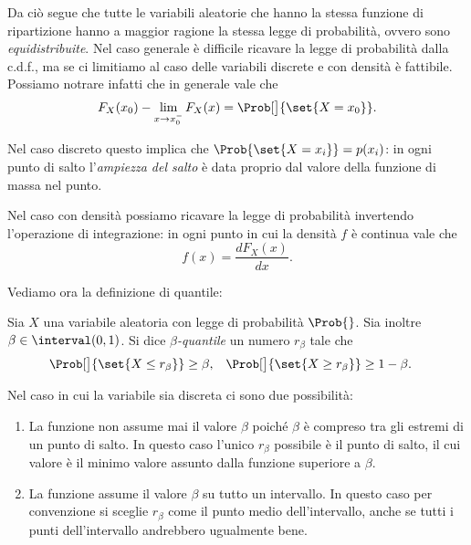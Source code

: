 Da ciò segue che tutte le variabili aleatorie che hanno la stessa funzione di ripartizione hanno a maggior ragione la stessa legge di probabilità, ovvero sono \emph{equidistribuite}. Nel caso generale è difficile ricavare la legge di probabilità dalla c.d.f., ma se ci limitiamo al caso delle variabili discrete e con densità è fattibile. Possiamo notrare infatti che in generale vale che \[
    F_X(x_0) - \lim_{x \to x_0^-} F_X(x) = \Prob[\big]{\set{X = x_0}}.    
\]

Nel caso discreto questo implica che $\Prob{\set{X = x_i}} = p(x_i)$: in ogni punto di salto l'\emph{ampiezza del salto} è data proprio dal valore della funzione di massa nel punto.

Nel caso con densità possiamo ricavare la legge di probabilità invertendo l'operazione di integrazione: in ogni punto in cui la densità $f$ è continua vale che \[
    f(x) = \frac{dF_X(x)}{dx}.    
\]

Vediamo ora la definizione di quantile:
\begin{definition}
    [Quantile]
    Sia $X$ una variabile aleatoria con legge di probabilità $\Prob{}$. Sia inoltre $\beta \in \interval({0, 1})$. Si dice \emph{$\beta$-quantile} un numero $r_\beta$ tale che \begin{align*}
        \Prob[\big]{\set{X \leq r_\beta}} \geq \beta,\quad &\Prob[\big]{\set{X \geq r_\beta}} \geq 1 - \beta.   
    \end{align*}
\end{definition}

Nel caso in cui la variabile sia discreta ci sono due possibilità:
\begin{enumerate}
    \item La funzione non assume mai il valore $\beta$ poiché $\beta$ è compreso tra gli estremi di un punto di salto.
    In questo caso l'unico $r_\beta$ possibile è il punto di salto, il cui valore è il minimo valore assunto dalla funzione superiore a $\beta$.

    \item La funzione assume il valore $\beta$ su tutto un intervallo. In questo caso per convenzione si sceglie $r_\beta$ come il punto medio dell'intervallo, anche se tutti i punti dell'intervallo andrebbero ugualmente bene.
\end{enumerate}
\begin{figure}[H]
    \begin{center}
        
    \end{center}
\end{figure}

